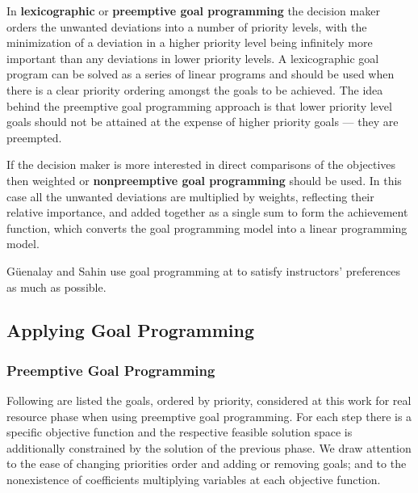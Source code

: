 In \textbf{lexicographic} or \textbf{preemptive goal programming} the decision maker orders the unwanted deviations into a number of priority levels, with the minimization of a deviation in a higher priority level being infinitely more important than any deviations in lower priority levels. A lexicographic goal program can be solved as a series of linear programs and should be used when there is a clear priority ordering amongst the goals to be achieved. The idea behind the preemptive goal programming approach is that lower priority level goals should not be attained at the expense of higher priority goals --- they are preempted.

If the decision maker is more interested in direct comparisons of the objectives then weighted or \textbf{nonpreemptive goal programming} should be used. In this case all the unwanted deviations are multiplied by weights, reflecting their relative importance, and added together as a single sum to form the achievement function, which converts the goal programming model into a linear programming model.

G\"{u}enalay and Sahin use goal programming at \cite{Guenalay2006} to satisfy instructors' preferences as much as possible.


\subsection{Applying Goal Programming}

\subsubsection{Preemptive Goal Programming}

Following are listed the goals, ordered by priority, considered at this work for real resource phase when using preemptive goal programming. For each step there is a specific objective function and the respective feasible solution space is additionally constrained by the solution of the previous phase. We draw attention to the ease of changing priorities order and adding or removing goals; and to the nonexistence of coefficients multiplying variables at each objective function.

